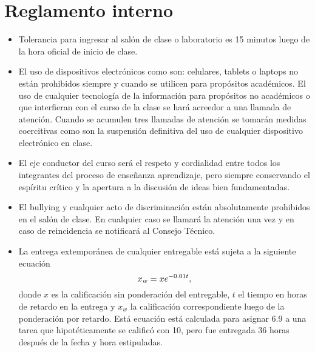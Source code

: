 \documentclass[letterpaper, 11pt]{article}
\begin{document}
\section{Reglamento interno}
\begin{itemize}
  \item Tolerancia para ingresar al salón de clase o laboratorio es 15 minutos luego de la hora oficial de inicio de clase.
  \item El uso de dispositivos electrónicos como son: celulares, tablets o laptops no están prohibidos siempre y cuando se utilicen para propósitos académicos. El uso de cualquier tecnología de la información para propósitos no académicos o que interfieran con el curso de la clase se hará acreedor a una llamada de atención. Cuando se acumulen tres llamadas de atención se tomarán medidas coercitivas como son la suspensión definitiva del uso de cualquier dispositivo electrónico en clase.
  \item El eje conductor del curso será el respeto y cordialidad entre todos los integrantes del proceso de enseñanza aprendizaje, pero siempre conservando el espíritu crítico y la apertura a la discusión de ideas bien fundamentadas.
  \item El bullying y cualquier acto de discriminación están absolutamente prohibidos en el salón de clase. En cualquier caso se llamará la atención una vez y en caso de reincidencia se notificará al Consejo Técnico.
  \item La entrega extemporánea de cualquier entregable está sujeta a la siguiente ecuación
   \begin{equation}
     \large x_w = x{e}^{-0.01t},
   \end{equation}
   donde $x$ es la calificación sin ponderación del entregable, $t$ el tiempo en horas de retardo en la entrega y $x_w$ la calificación correspondiente luego de la ponderación por retardo. Está ecuación está calculada para asignar 6.9 a una tarea que hipotéticamente se calificó con 10, pero fue entregada 36 horas después de la fecha y hora estipuladas.
\end{itemize}
\end{document}
